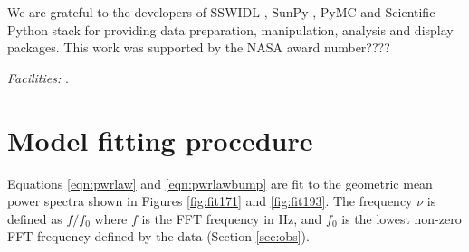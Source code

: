 \documentclass{aastex}
\begin{document}
{\acknowledgments

We are grateful to the developers of SSWIDL
\citep{1998SoPh..182..497F}, SunPy \citep{mumford-proc-scipy-2013}, PyMC
\citep{Patil:Huard:Fonnesbeck:2010:JSSOBK:v35i04} and Scientific Python
stack for providing data preparation, manipulation, analysis and
display packages.  This work was supported by the NASA award number????



{\it Facilities:} .



\appendix

\section{Model fitting procedure}\label{sec:app:ind}
Equations \ref{eqn:pwrlaw} and \ref{eqn:pwrlawbump} are fit to the
geometric mean power spectra shown in Figures \ref{fig:fit171} and
\ref{fig:fit193}.  The frequency $\nu$ is defined as $f/f_{0}$ where
$f$ is the FFT frequency in Hz, and $f_{0}$ is the lowest non-zero FFT
frequency defined by the data (Section \ref{sec:obs}).

}
\end{document}
